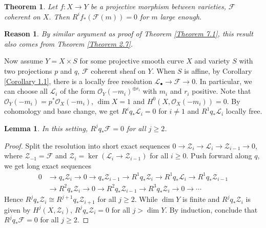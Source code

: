\documentclass{ctexart}
\newtheorem{theorem}{Theorem}[section]
\newtheorem{lemma}{Lemma}[section]
\newtheorem{reason}{Reason}[section]
\begin{document}
\begin{theorem}
    Let $f: X \rightarrow Y$ be a projective morphism between varieties, $\mathcal{F}$ coherent on $X$.
    Then $R^{i}f_{\ast}(\mathcal{F}(m)) = 0$ for $m$ large enough.
    \label{Theorem 7.2}
\end{theorem}
\begin{reason}
    By similar argument as proof of Theorem \ref{Theorem 7.1}, this result also comes from Theorem \ref{Theorem 2.7}.
\end{reason}
Now assume $Y = X \times S$ for some projective smooth curve $X$ and variety $S$ with two projections $p$ and $q$, $\mathcal{F}$ coherent sheaf on $Y$.
When $S$ is affine, by Corollary \ref{Corollary 1.1}, there is a locally free resolution $\mathcal{L}_{\bullet} \rightarrow \mathcal{F} \rightarrow 0$.
In particular, we can choose all $\mathcal{L}_{i}$ of the form $\mathcal{O}_{Y}(-m_{i})^{\oplus r_{i}}$ with $m_{i}$ and $r_{i}$ positive.
Note that $\mathcal{O}_{Y}(-m_{i}) = p^{\ast}\mathcal{O}_{X}(-m_{i})$, $\dim X = 1$ and $H^{0}(X, \mathcal{O}_{X}(-m_{i})) = 0$.
By cohomology and base change, we get $R^{i}q_{\ast}\mathcal{L}_{i} = 0$ for $i \neq 1$ and $R^{1}q_{\ast}\mathcal{L}_{i}$ locally free.
\begin{lemma}
    In this setting, $R^{j}q_{\ast}\mathcal{F} = 0$ for all $j \ge 2$.
    \label{Lemma 7.5}
\end{lemma}
\begin{proof}
    Split the resolution into short exact sequences $0 \rightarrow \mathcal{Z}_{i} \rightarrow \mathcal{L}_{i} \rightarrow \mathcal{Z}_{i - 1} \rightarrow 0$,
    where $\mathcal{Z}_{-1} = \mathcal{F}$ and $\mathcal{Z}_{i} = \ker (\mathcal{L}_{i} \rightarrow \mathcal{Z}_{i - 1})$ for all $i \ge 0$.
    Push forward along $q$, we get long exact sequences
    \begin{equation}
        \begin{split}
            0 & \longrightarrow q_{\ast}\mathcal{Z}_{i} \longrightarrow 0 \longrightarrow q_{\ast}\mathcal{Z}_{i - 1} \longrightarrow R^{1}q_{\ast}\mathcal{Z}_{i} \longrightarrow R^{1}q_{\ast}\mathcal{L}_{i} \longrightarrow R^{1}q_{\ast}\mathcal{Z}_{i - 1} \\
            & \longrightarrow R^{2}q_{\ast}\mathcal{Z}_{i} \longrightarrow 0 \longrightarrow R^{2}q_{\ast}\mathcal{Z}_{i - 1} \longrightarrow R^{3}q_{\ast}\mathcal{Z}_{i} \longrightarrow 0 \longrightarrow \cdots
        \end{split}
    \end{equation}
    Hence $R^{j}q_{\ast}\mathcal{Z}_{i} \cong R^{j + 1}q_{\ast}\mathcal{Z}_{i + 1}$ for all $j \ge 2$.
    While $\dim Y$ is finite and $R^{j}q_{\ast}\mathcal{Z}_{i}$ is given by $H^{j}(X, \mathcal{Z}_{i})$, $R^{j}q_{\ast}\mathcal{Z}_{i} = 0$ for all $j > \dim Y$.
    By induction, conclude that $R^{j}q_{\ast}\mathcal{F} = 0$ for all $j \ge 2$.
\end{proof}
\end{document}
